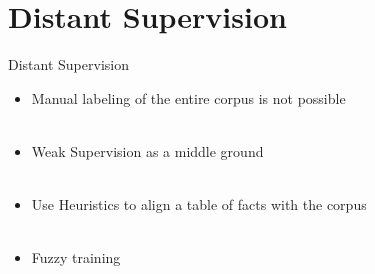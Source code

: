 \documentclass{beamer}
\begin{document}
\section{Distant Supervision}
\begin{frame}{Distant Supervision} \pause 
\begin{itemize}
 \item Manual labeling of the entire corpus is not possible \pause \\~\\
 \item Weak Supervision as a middle ground \pause \\~\\
  \item Use Heuristics to align a table of facts with the corpus  \pause \\~\\
  \item Fuzzy training 
  
\end{itemize}
\end{frame}
\end{document}
